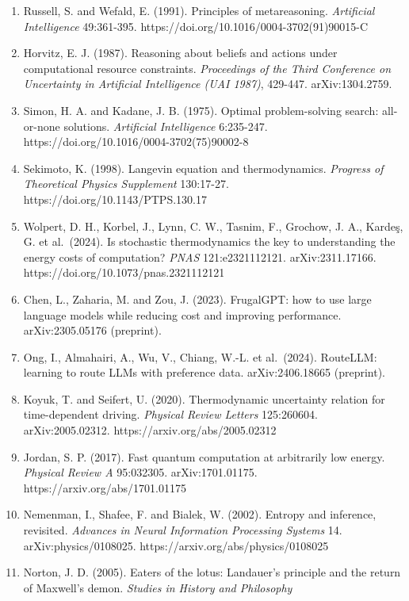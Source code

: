 \documentclass[
  10pt,
]{article}
\newcounter{none} %
\begin{document}
\begin{enumerate}
  \emph{Neural Computation} 15:1191-1253.
  https://doi.org/10.1162/089976603321780272
\item
  Russell, S. and Wefald, E. (1991). Principles of metareasoning.
  \emph{Artificial Intelligence} 49:361-395.
  https://doi.org/10.1016/0004-3702(91)90015-C
\item
  Horvitz, E. J. (1987). Reasoning about beliefs and actions under
  computational resource constraints. \emph{Proceedings of the Third
  Conference on Uncertainty in Artificial Intelligence (UAI 1987)},
  429-447. arXiv:1304.2759.
\item
  Simon, H. A. and Kadane, J. B. (1975). Optimal problem-solving search:
  all-or-none solutions. \emph{Artificial Intelligence} 6:235-247.
  https://doi.org/10.1016/0004-3702(75)90002-8
\item
  Sekimoto, K. (1998). Langevin equation and thermodynamics.
  \emph{Progress of Theoretical Physics Supplement} 130:17-27.
  https://doi.org/10.1143/PTPS.130.17
\item
  Wolpert, D. H., Korbel, J., Lynn, C. W., Tasnim, F., Grochow, J. A.,
  Kardeş, G. et al.~(2024). Is stochastic thermodynamics the key to
  understanding the energy costs of computation? \emph{PNAS}
  121:e2321112121. arXiv:2311.17166.
  https://doi.org/10.1073/pnas.2321112121
\item
  Chen, L., Zaharia, M. and Zou, J. (2023). FrugalGPT: how to use large
  language models while reducing cost and improving performance.
  arXiv:2305.05176 (preprint).
\item
  Ong, I., Almahairi, A., Wu, V., Chiang, W.-L. et al.~(2024). RouteLLM:
  learning to route LLMs with preference data. arXiv:2406.18665
  (preprint).
\item
  Koyuk, T. and Seifert, U. (2020). Thermodynamic uncertainty relation
  for time-dependent driving. \emph{Physical Review Letters} 125:260604.
  arXiv:2005.02312. https://arxiv.org/abs/2005.02312
\item
  Jordan, S. P. (2017). Fast quantum computation at arbitrarily low
  energy. \emph{Physical Review A} 95:032305. arXiv:1701.01175.
  https://arxiv.org/abs/1701.01175
\item
  Nemenman, I., Shafee, F. and Bialek, W. (2002). Entropy and inference,
  revisited. \emph{Advances in Neural Information Processing Systems}
  14. arXiv:physics/0108025. https://arxiv.org/abs/physics/0108025
\item
  Norton, J. D. (2005). Eaters of the lotus: Landauer's principle and
  the return of Maxwell's demon. \emph{Studies in History and Philosophy
}
\end{enumerate}
\end{document}
